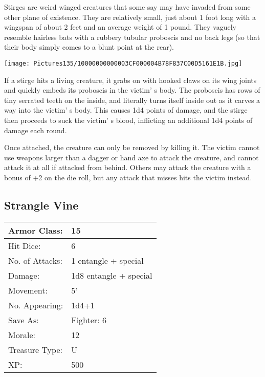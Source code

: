 \documentclass[a4paper,twoside,openany,10pt]{book}
\begin{document}
\begin{multicols}{2}
Stirges are weird winged creatures that some say may have invaded from some other plane of existence. They are relatively small, just about 1 foot long with a wingspan of about 2 feet and an average weight of 1 pound. They vaguely resemble hairless bats with a rubbery tubular proboscis and no back legs (so that their body simply comes to a blunt point at the rear).


\begin{center} \texttt{[image: Pictures135/10000000000003CF000004B78F837C00D5161E1B.jpg]} \end{center}

If a stirge hits a living creature, it grabs on with hooked claws on its wing joints and quickly embeds its proboscis in the victim' s body. The proboscis has rows of tiny serrated teeth on the inside, and literally turns itself inside out as it carves a way into the victim' s body. This causes 1d4 points of damage, and the stirge then proceeds to suck the victim' s blood, inflicting an additional 1d4 points of damage each round.

Once attached, the creature can only be removed by killing it. The victim cannot use weapons larger than a dagger or hand axe to attack the creature, and cannot attack it at all if attacked from behind. Others may attack the creature with a bonus of +2 on the die roll, but any attack that misses hits the victim instead.

\subsection*{Strangle Vine}\label{strangle-vine}

\begin{tabularx}{0.50\textwidth}{@{}lX@{}}
Armor Class: & 15 \\\hline
Hit Dice: & 6 \\\hline
No. of Attacks: & 1 entangle + special \\\hline
Damage: & 1d8 entangle + special \\\hline
Movement: & 5' \\\hline
No. Appearing: & 1d4+1 \\\hline
Save As: & Fighter: 6 \\\hline
Morale: & 12 \\\hline
Treasure Type: & U \\\hline
XP: & 500 \\\hline
\end{tabularx}\medskip


\end{multicols}
\end{document}
